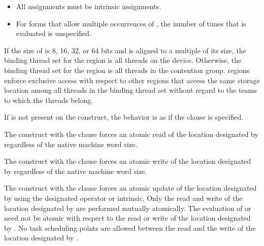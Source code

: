 \begin{fortranspecific}
\begin{itemize}
\vspace{-2 pt} %
\item All assignments must be intrinsic assignments.

\vspace{-2 pt} %
\item For forms that allow multiple occurrences of , the number of times that  is
evaluated is unspecified.
\end{itemize}
\end{fortranspecific}


\begin{samepage}

\binding
If the size of  is 8, 16, 32, or 64 bits and  is aligned to a
multiple of its size, the binding thread set for the  region is
all threads on the device. Otherwise, the binding thread set for the
 region is all threads in the contention group.  
regions enforce exclusive access with respect to other  regions
that access the same storage location  among all threads in the
binding thread set without regard to the teams to which the threads belong.

\descr

If  is not present on the construct, the behavior is as if
the  clause is specified.

The  construct with the  clause forces an
atomic read of the location 
designated by  regardless of the native machine word size.
\end{samepage}

The  construct with the  clause forces an
atomic write of the location 
designated by  regardless of the native machine word size.

The  construct with the  clause forces an
atomic update of the location designated by  using the
designated operator or intrinsic.  Only the read and write of the
location designated by  are performed mutually atomically. The
evaluation of  or  need not be atomic with respect to
the read or write of the location designated by . No task scheduling
points are allowed between the read and the write of the location designated
by . 

